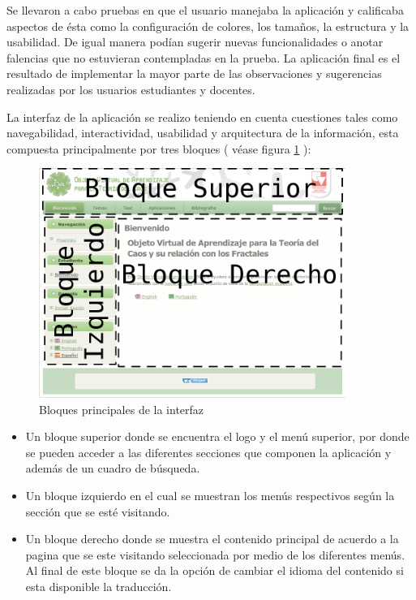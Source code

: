 \documentclass[letterpaper, 11pt, oneside]{article}
\theoremstyle{definition}
\theoremstyle{remark}
\begin{document}
Se llevaron a cabo pruebas en que el usuario manejaba la aplicación y calificaba aspectos de ésta como la configuración de colores, los tamaños, la estructura y la usabilidad. De igual manera podían sugerir nuevas funcionalidades o anotar falencias que no estuvieran contempladas en la prueba. La aplicación final es el resultado de implementar la mayor parte de las observaciones y sugerencias realizadas por los usuarios estudiantes y docentes.

La interfaz de la aplicación se realizo teniendo en cuenta cuestiones tales como navegabilidad, interactividad, usabilidad y arquitectura de la información, esta compuesta principalmente por tres bloques ( véase figura \ref{bloques} ):

\begin{figure}[h] 
\begin{center}
\includegraphics[width=10cm,clip]{Imagenes/bloques.png}
\end{center}
\caption{Bloques principales de la interfaz}
\label{bloques}
\end{figure}

\begin{itemize}
 \item Un bloque superior donde se encuentra el logo y el menú superior, por donde se pueden acceder a las diferentes secciones que componen la aplicación y además de un cuadro de búsqueda.
 \item Un bloque izquierdo en el cual se muestran los menús respectivos según la sección que se esté visitando.
 \item Un bloque derecho donde se muestra el contenido principal de acuerdo a la pagina que se este visitando seleccionada por medio de los diferentes menús. Al final de este bloque se da la opción de cambiar el idioma del contenido si esta disponible la traducción.
\end{itemize}
\end{document}
